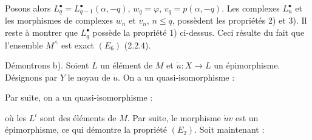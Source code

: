 \clearpage
{}%
\begingroup\small\setlength{\parskip}{0pt}\setlength{\emergencystretch}{1.5em}
\setlength{\abovedisplayskip}{4pt plus 2pt minus 2pt}%
\setlength{\belowdisplayskip}{4pt plus 2pt minus 2pt}%

Posons alors $L_q^\bullet=L_{q-1}^\bullet(\alpha,-q)$,
$w_q=\varphi$, $v_q=p(\alpha,-q)$. Les complexes $L_n^\bullet$ et les
morphismes de complexes $w_n$ et $v_n$, $n\leq q$, possèdent les propriétés
2) et 3). Il reste à montrer que $L_q^\bullet$ possède la propriété 1)
ci-dessus. Ceci résulte du fait que l'ensemble $M^\wedge$ est exact $(E_6)$
(2.2.4).

Démontrons b). Soient $L$ un élément de $M$ et
$\dot u\colon X\longrightarrow L$ un épimorphisme. Désignons par $Y$ le
noyau de $\dot u$. On a un quasi-isomorphisme :

\begin{center}
\end{center}
Par suite, on a un quasi-isomorphisme :

\begin{center}
\end{center}

où les $L^i$ sont des éléments de $M$. Par suite, le morphisme $\dot u v$
est un épimorphisme, ce qui démontre la propriété $(E_2)$. Soit maintenant :

